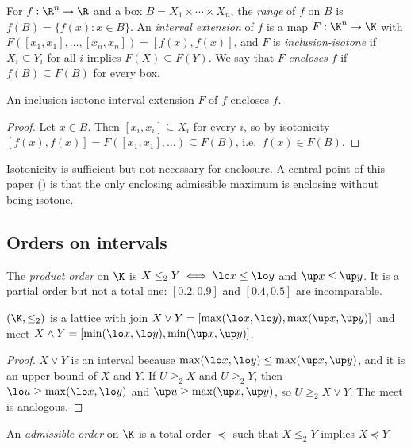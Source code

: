 For $f:\R^n\to\R$ and a box $B=X_1\times\cdots\times X_n$, the \emph{range} of $f$ on $B$ is $f(B)=\{f(x):x\in B\}$. An \emph{interval extension} of $f$ is a map $F:\K^n\to\K$ with $F([x_1,x_1],\dots,[x_n,x_n])=[f(x),f(x)]$, and $F$ is \emph{inclusion-isotone} if $X_i\subseteq Y_i$ for all $i$ implies $F(X)\subseteq F(Y)$. We say that $F$ \emph{encloses} $f$ if $f(B)\subseteq F(B)$ for every box.

\begin{theorem}\label{thm:fund}
An inclusion-isotone interval extension $F$ of $f$ encloses $f$.
\end{theorem}

\begin{proof}
Let $x\in B$. Then $[x_i,x_i]\subseteq X_i$ for every $i$, so by isotonicity $[f(x),f(x)]=F([x_1,x_1],\dots)\subseteq F(B)$, i.e.\ $f(x)\in F(B)$.
\end{proof}

Isotonicity is sufficient but not necessary for enclosure. A central point of this paper () is that the only enclosing admissible maximum is enclosing without being isotone.

\subsection{Orders on intervals}

The \emph{product order} on $\K$ is $X\le_2Y\iff\lo x\le\lo y$ and $\up x\le\up y$. It is a partial order but not a total one: $[0.2,0.9]$ and $[0.4,0.5]$ are incomparable.

\begin{lemma}\label{lem:join}
$(\K,\le_2)$ is a lattice with join $X\vee Y=[\max(\lo x,\lo y),\max(\up x,\up y)]$ and meet $X\wedge Y=[\min(\lo x,\lo y),\min(\up x,\up y)]$.
\end{lemma}

\begin{proof}
$X\vee Y$ is an interval because $\max(\lo x,\lo y)\le\max(\up x,\up y)$, and it is an upper bound of $X$ and $Y$. If $U\ge_2X$ and $U\ge_2Y$, then $\lo u\ge\max(\lo x,\lo y)$ and $\up u\ge\max(\up x,\up y)$, so $U\ge_2X\vee Y$. The meet is analogous.
\end{proof}

\begin{definition}
An \emph{admissible order} on $\K$ is a total order $\preceq$ such that $X\le_2Y$ implies $X\preceq Y$.
\end{definition}

